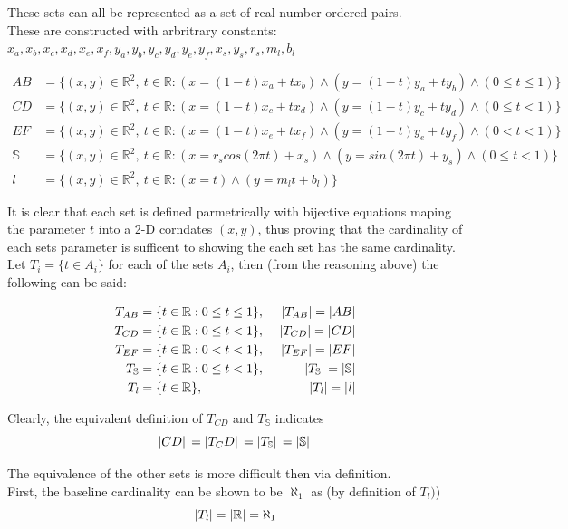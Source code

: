 \documentclass[]{article}
\newcommand{\R}{\mathbb{R}}
\begin{document}
These sets can all be represented as a set of real number ordered pairs.\\
These are constructed with arbritrary constants: 
$x_a,x_b,x_c,x_d,x_e,x_f,y_a,y_b,y_c,y_d,y_e,y_f,x_s,y_s,r_s,m_l,b_l$

\begin{align*}
	AB &= \{(x,y) \in \R^2, \ t \in \R : 
	(x = (1-t) x_a + t x_b) \land (y = (1-t) y_a + t y_b)
	\land (0 \leq t \leq 1)\}\\
	CD &= \{(x,y) \in \R^2, \ t \in \R : 
	(x = (1-t) x_c + t x_d) \land (y = (1-t) y_c + t y_d)
	\land (0 \leq t < 1)\}\\
	EF &= \{(x,y) \in \R^2, \ t \in \R : 
	(x = (1-t) x_e + t x_f) \land (y = (1-t) y_e + t y_f)
	\land (0 < t < 1)\}\\
	\mathbb{S} &= \{(x,y) \in \R^2, \ t \in \R : 
	(x = r_s cos(2 \pi t) + x_s) \land (y = sin(2 \pi t) + y_s)
	\land (0 \leq t < 1)\}\\
	\mathit{l} &= \{(x,y) \in \R^2, \ t \in \R: (x = t) \land (y = m_l t + b_l)\}
\end{align*}

It is clear that each set is defined parmetrically with bijective equations maping 
the parameter $t$ into a 2-D corndates $(x,y)$, thus proving that the cardinality 
of each sets parameter is sufficent to showing the each set has the same cardinality.\\

Let $T_i = \{t \in A_i\}$ for each of the sets $A_i$, then (from the reasoning above) 
the following can be said:

\begin{align*}
	T_{AB} &= \{t \in \R : 0 \leq t \leq 1\}, \ &\abs{T_{AB}} = \abs{AB}\\
	T_{CD} &= \{t \in \R : 0 \leq t < 1\}, \ &\abs{T_{CD}} = \abs{CD}\\
	T_{EF} &= \{t \in \R : 0 < t < 1\}, \ &\abs{T_{EF}} = \abs{EF}\\
	T_{\mathbb{S}} &= \{t \in \R : 0 \leq t < 1\}, \ &\abs{T_{\mathbb{S}}} = \abs{\mathbb{S}}\\
	T_{\mathit{l}} &= \{t \in \R\}, \ &\abs{T_{\mathit{l}}} = \abs{\mathit{l}}\\
\end{align*}

Clearly, the equivalent definition of $T_{CD}$ and $T_{\mathbb{S}}$ indicates
$$\abs*{CD} = \abs*{T_CD} = \abs*{T_\mathbb{S}} = \abs*{\mathbb{S}}$$

The equivalence of the other sets is more difficult then via definition.\\
First, the baseline cardinality can be shown to be $\aleph_1$ as (by definition of $T_{\mathit{l}})$)
$$\abs{T_\mathit{l}} = \abs{\R} = \aleph_1$$
\end{document}
